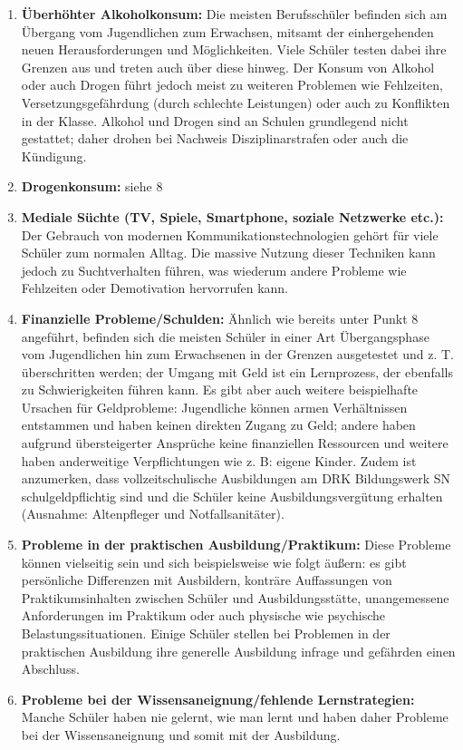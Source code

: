 \begin{enumerate}
	\item \textbf{Überhöhter Alkoholkonsum:} Die meisten Berufsschüler befinden sich am Übergang vom Jugendlichen zum Erwachsen, mitsamt der einhergehenden neuen Herausforderungen und Möglichkeiten. Viele Schüler testen dabei ihre Grenzen aus und treten auch über diese hinweg. Der Konsum von Alkohol oder auch Drogen führt jedoch meist zu weiteren Problemen wie Fehlzeiten, Versetzungsgefährdung (durch schlechte Leistungen) oder auch zu Konflikten in der Klasse. Alkohol und Drogen sind an Schulen grundlegend nicht gestattet; daher drohen bei Nachweis Disziplinarstrafen oder auch die Kündigung.
	\item \textbf{Drogenkonsum:} siehe 8
	\item \textbf{Mediale Süchte (TV, Spiele, Smartphone, soziale Netzwerke etc.):} Der Gebrauch von modernen Kommunikationstechnologien gehört für viele Schüler zum normalen Alltag. Die massive Nutzung dieser Techniken kann jedoch zu Suchtverhalten führen, was wiederum andere Probleme wie Fehlzeiten oder Demotivation hervorrufen kann.
	\item \textbf{Finanzielle Probleme/Schulden:} Ähnlich wie bereits unter Punkt 8 angeführt, befinden sich die meisten Schüler in einer Art Übergangsphase vom Jugendlichen hin zum Erwachsenen in der Grenzen ausgetestet und z. T. überschritten werden; der Umgang mit Geld ist ein Lernprozess, der ebenfalls zu Schwierigkeiten führen kann. Es gibt aber auch weitere beispielhafte Ursachen für Geldprobleme: Jugendliche können armen Verhältnissen entstammen und haben keinen direkten Zugang zu Geld; andere haben aufgrund übersteigerter Ansprüche keine finanziellen Ressourcen und weitere haben anderweitige Verpflichtungen wie z. B: eigene Kinder. Zudem ist anzumerken, dass vollzeitschulische Ausbildungen am DRK Bildungswerk SN schulgeldpflichtig sind und die Schüler keine Ausbildungsvergütung erhalten (Ausnahme: Altenpfleger und Notfallsanitäter).
	\item \textbf{Probleme in der praktischen Ausbildung/Praktikum:} Diese Probleme können vielseitig sein und sich beispielsweise wie folgt äußern: es gibt persönliche Differenzen mit Ausbildern, konträre Auffassungen von Praktikumsinhalten zwischen Schüler und Ausbildungsstätte, unangemessene Anforderungen im Praktikum oder auch physische wie psychische Belastungssituationen. Einige Schüler stellen bei Problemen in der praktischen Ausbildung ihre generelle Ausbildung infrage und gefährden einen Abschluss.  
	\item \textbf{Probleme bei der Wissensaneignung/fehlende Lernstrategien:} Manche Schüler haben nie gelernt, wie man lernt und haben daher Probleme bei der Wissensaneignung und somit mit der Ausbildung.

\end{enumerate}
